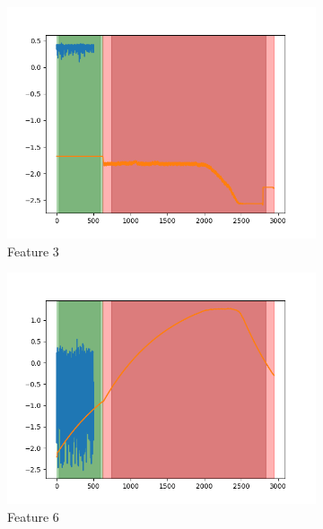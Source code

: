 \documentclass[oneside, a4paper, onecolumn, 11pt]{article}
\begin{document}
\begin{figure}
  \hfill
  \begin{subfigure}{0.3\textwidth}
      \centering
      \includegraphics[width=\linewidth]{images/reconstruction/dim_3.png}
      \caption{Feature 3}
  \end{subfigure}
  \begin{subfigure}{0.3\textwidth}
    \centering
    \includegraphics[width=\linewidth]{images/reconstruction/dim_6.png}
    \caption{Feature 6}
\end{subfigure}
\begin{subfigure}{0.3\textwidth}
  \centering

\end{subfigure}
\end{figure}
\end{document}
